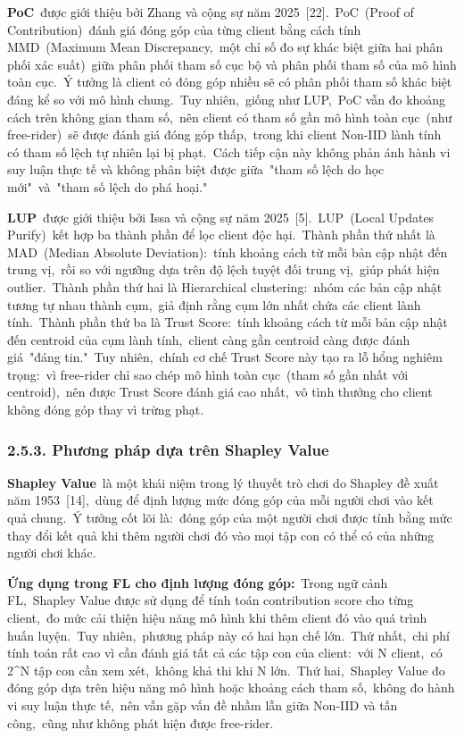 \textbf{PoC}~được giới thiệu bởi Zhang và cộng sự năm 2025~{[}22{]}.~PoC~(Proof of Contribution)~đánh giá đóng góp của từng client bằng cách tính MMD~(Maximum Mean Discrepancy,~một chỉ số đo sự khác biệt giữa hai phân phối xác suất)~giữa phân phối tham số cục bộ và phân phối tham số của mô hình toàn cục.~Ý tưởng là client có đóng góp nhiều sẽ có phân phối tham số khác biệt đáng kể so với mô hình chung.~Tuy nhiên,~giống như LUP,~PoC vẫn đo khoảng cách trên không gian tham số,~nên client có tham số gần mô hình toàn cục~(như free-rider)~sẽ được đánh giá đóng góp thấp,~trong khi client Non-IID lành tính có tham số lệch tự nhiên lại bị phạt.~Cách tiếp cận này không phản ánh hành vi suy luận thực tế và không phân biệt được giữa~"tham số lệch do học mới"~và~"tham số lệch do phá hoại."

\textbf{LUP}~được giới thiệu bởi Issa và cộng sự năm 2025~{[}5{]}.~LUP~(Local Updates Purify)~kết hợp ba thành phần để lọc client độc hại.~Thành phần thứ nhất là MAD~(Median Absolute Deviation):~tính khoảng cách từ mỗi bản cập nhật đến trung vị,~rồi so với ngưỡng dựa trên độ lệch tuyệt đối trung vị,~giúp phát hiện outlier.~Thành phần thứ hai là Hierarchical clustering:~nhóm các bản cập nhật tương tự nhau thành cụm,~giả định rằng cụm lớn nhất chứa các client lành tính.~Thành phần thứ ba là Trust Score:~tính khoảng cách từ mỗi bản cập nhật đến centroid của cụm lành tính,~client càng gần centroid càng được đánh giá~"đáng tin."~Tuy nhiên,~chính cơ chế Trust Score này tạo ra lỗ hổng nghiêm trọng:~vì free-rider chỉ sao chép mô hình toàn cục~(tham số gần nhất với centroid),~nên được Trust Score đánh giá cao nhất,~vô tình thưởng cho client không đóng góp thay vì trừng phạt.

\subsubsection{2.5.3. Phương pháp dựa trên Shapley Value}\label{phux1b0ux1a1ng-phuxe1p-dux1ef1a-truxean-shapley-value}

\textbf{Shapley Value}~là một khái niệm trong lý thuyết trò chơi do Shapley đề xuất năm 1953~{[}14{]},~dùng để định lượng mức đóng góp của mỗi người chơi vào kết quả chung.~Ý tưởng cốt lõi là:~đóng góp của một người chơi được tính bằng mức thay đổi kết quả khi thêm người chơi đó vào mọi tập con có thể có của những người chơi khác.

\textbf{Ứng dụng trong FL cho định lượng đóng góp:}~Trong ngữ cảnh FL,~Shapley Value được sử dụng để tính toán contribution score cho từng client,~đo mức cải thiện hiệu năng mô hình khi thêm client đó vào quá trình huấn luyện.~Tuy nhiên,~phương pháp này có hai hạn chế lớn.~Thứ nhất,~chi phí tính toán rất cao vì cần đánh giá tất cả các tập con của client:~với N client,~có 2\^{}N tập con cần xem xét,~không khả thi khi N lớn.~Thứ hai,~Shapley Value đo đóng góp dựa trên hiệu năng mô hình hoặc khoảng cách tham số,~không đo hành vi suy luận thực tế,~nên vẫn gặp vấn đề nhầm lẫn giữa Non-IID và tấn công,~cũng như không phát hiện được free-rider.

